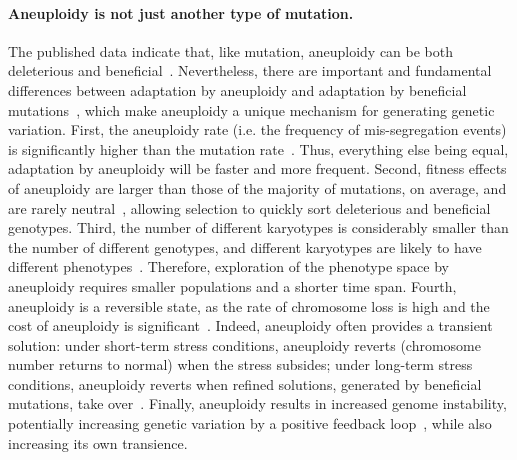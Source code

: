 \documentclass[12pt]{extarticle}
\begin{document}
\paragraph*{Aneuploidy is not just another type of mutation.}
The published data indicate that, like mutation, aneuploidy can be both deleterious and beneficial~\citep{Pavelka2010, Sheltzer2011}.
Nevertheless, there are important and fundamental differences between adaptation by aneuploidy
and adaptation by beneficial mutations~\citep{Yona2015}, which make aneuploidy a unique mechanism for generating genetic
variation.
First, the aneuploidy rate (i.e. the frequency of mis-segregation events) is significantly higher than the
mutation rate~\citep{Santaguida2015review}.
Thus, everything else being equal, adaptation by aneuploidy will be faster and more frequent.
Second, fitness effects of aneuploidy are larger than those of the majority of mutations, on average, and are rarely
neutral~\citep{Pavelka2010, Yona2012, Sunshine2015}, allowing selection to quickly sort deleterious and beneficial genotypes.
Third, the number of different karyotypes is considerably smaller than the number of different genotypes, and different karyotypes are likely to have different phenotypes~\citep{Pavelka2010}.
Therefore, exploration of the phenotype space by aneuploidy requires smaller populations and a shorter time span.
Fourth, aneuploidy is a reversible state, as the rate of chromosome loss is high and the cost of aneuploidy is significant~\citep{Niwa2006}.
Indeed, aneuploidy often provides a transient solution: under short-term stress conditions, aneuploidy reverts (chromosome number returns to normal) when the stress subsides; under long-term stress conditions, aneuploidy reverts when refined solutions, generated by beneficial mutations, take over~\citep{Yona2012}.
Finally, aneuploidy results in increased genome instability, potentially increasing genetic variation by a positive feedback loop~\citep{Rancati2013, Bouchonville2009, Zhu2012}, while also increasing its own transience.
\end{document}
